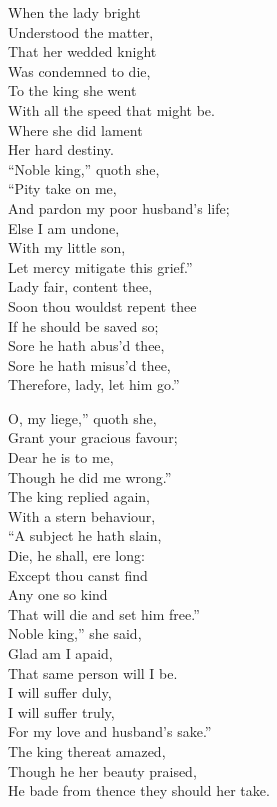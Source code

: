 \begin{dcverse}
\begin{patverse}
When the lady bright\\
Understood the matter,\\
That her wedded knight\\
Was condemned to die,\\
To the king she went\\
With all the speed that might be.\\
Where she did lament\\
Her hard destiny.\\
“Noble king,” quoth she,\\
“Pity take on me,\\
And pardon my poor husband’s life;\\
Else I am undone,\\
With my little son,\\
Let mercy mitigate this grief.”\\
Lady fair, content thee,\\
Soon thou wouldst repent thee\\
If he should be saved so;\\
Sore he hath abus’d thee,\\
Sore he hath misus’d thee,\\
Therefore, lady, let him go.”
\end{patverse}

\begin{patverse}
O, my liege,” quoth she,\\
Grant your gracious favour;\\
Dear he is to me,\\
Though he did me wrong.”\\
The king replied again,\\
With a stern behaviour,\\
“A subject he hath slain,\\
Die, he shall, ere long:\\
Except thou canst find\\
Any one so kind\\
That will die and set him free.”\\
Noble king,” she said,\\
Glad am I apaid,\\
That same person will I be.\\
I will suffer duly,\\
I will suffer truly,\\
For my love and husband’s sake.”\\
The king thereat amazed,\\
Though he her beauty praised, \\
He bade from thence they should her take.
\end{patverse}


\end{dcverse}
